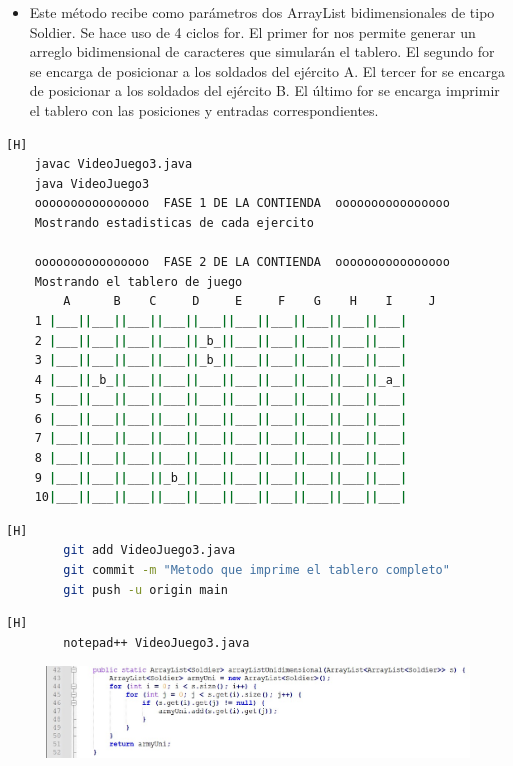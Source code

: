 \documentclass{article}
\begin{document}
	\begin{itemize}	
		\item Este método recibe como parámetros dos ArrayList bidimensionales de tipo Soldier. Se hace uso de 4 ciclos for. El primer for nos permite generar un arreglo bidimensional de caracteres que simularán el tablero. El segundo for se encarga de posicionar a los soldados del ejército A. El tercer for se encarga de posicionar a los soldados del ejército B. El último for se encarga imprimir el tablero con las posiciones y entradas correspondientes.
	\end{itemize}
		


	\begin{lstlisting}[language=bash,caption={Compilando y probando el tablero  }][H]
	javac VideoJuego3.java
	java VideoJuego3
	oooooooooooooooo  FASE 1 DE LA CONTIENDA  oooooooooooooooo
	Mostrando estadisticas de cada ejercito
	
	oooooooooooooooo  FASE 2 DE LA CONTIENDA  oooooooooooooooo
	Mostrando el tablero de juego
		A      B    C     D     E     F    G    H    I     J
	1 |___||___||___||___||___||___||___||___||___||___|
	2 |___||___||___||___||_b_||___||___||___||___||___|
	3 |___||___||___||___||_b_||___||___||___||___||___|
	4 |___||_b_||___||___||___||___||___||___||___||_a_|
	5 |___||___||___||___||___||___||___||___||___||___|
	6 |___||___||___||___||___||___||___||___||___||___|
	7 |___||___||___||___||___||___||___||___||___||___|
	8 |___||___||___||___||___||___||___||___||___||___|
	9 |___||___||___||_b_||___||___||___||___||___||___|
	10|___||___||___||___||___||___||___||___||___||___|
	\end{lstlisting}
	
	
	\begin{lstlisting}[language=bash,caption={Commit: Metodo que imprime el tablero completo}][H]
		git add VideoJuego3.java
		git commit -m "Metodo que imprime el tablero completo"			
		git push -u origin main
	\end{lstlisting}
	
	
	\begin{lstlisting}[language=bash,caption={Se implementa el método que genera un ArrayList unidimensional }][H]
		notepad++ VideoJuego3.java
	\end{lstlisting}
	
	\begin{figure}[H]
		\centering
		\includegraphics[width=1.1\textwidth,keepaspectratio]{img/3.jpg}
	\end{figure}
	
\end{document}
